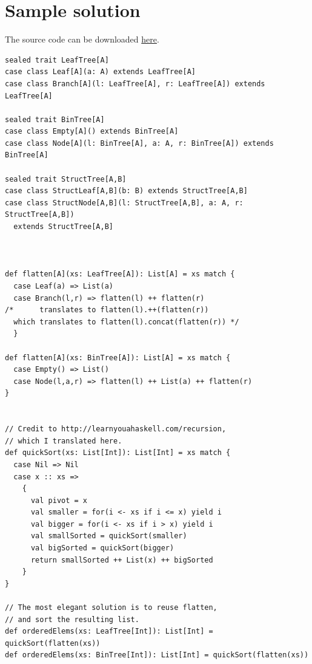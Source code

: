 \documentclass[11pt]{article}
\begin{document}
\section*{Sample solution}
\label{sec:org1686dbe}
The source code can be downloaded \href{./solutions/h1/h1.sc}{here}.

\begin{verbatim}
sealed trait LeafTree[A]
case class Leaf[A](a: A) extends LeafTree[A]
case class Branch[A](l: LeafTree[A], r: LeafTree[A]) extends LeafTree[A]

sealed trait BinTree[A]
case class Empty[A]() extends BinTree[A]
case class Node[A](l: BinTree[A], a: A, r: BinTree[A]) extends BinTree[A]

sealed trait StructTree[A,B]
case class StructLeaf[A,B](b: B) extends StructTree[A,B]
case class StructNode[A,B](l: StructTree[A,B], a: A, r: StructTree[A,B])
  extends StructTree[A,B]



def flatten[A](xs: LeafTree[A]): List[A] = xs match {
  case Leaf(a) => List(a)
  case Branch(l,r) => flatten(l) ++ flatten(r)
/*      translates to flatten(l).++(flatten(r))
  which translates to flatten(l).concat(flatten(r)) */
  }

def flatten[A](xs: BinTree[A]): List[A] = xs match {
  case Empty() => List()
  case Node(l,a,r) => flatten(l) ++ List(a) ++ flatten(r)
}


// Credit to http://learnyouahaskell.com/recursion,
// which I translated here.
def quickSort(xs: List[Int]): List[Int] = xs match {
  case Nil => Nil
  case x :: xs =>
    {
      val pivot = x
      val smaller = for(i <- xs if i <= x) yield i
      val bigger = for(i <- xs if i > x) yield i
      val smallSorted = quickSort(smaller)
      val bigSorted = quickSort(bigger)
      return smallSorted ++ List(x) ++ bigSorted
    }
}

// The most elegant solution is to reuse flatten,
// and sort the resulting list.
def orderedElems(xs: LeafTree[Int]): List[Int] = quickSort(flatten(xs))
def orderedElems(xs: BinTree[Int]): List[Int] = quickSort(flatten(xs))
\end{verbatim}
\end{document}
